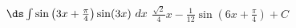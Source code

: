 {$\ds \int \sin\left(3x+\frac{\pi}{4}\right)\sin(3x)\ dx$}
{$\frac{\sqrt{2}}{4}x-\frac{1}{12}\sin\left(6x+\frac{\pi}{4}\right)+ C$}
